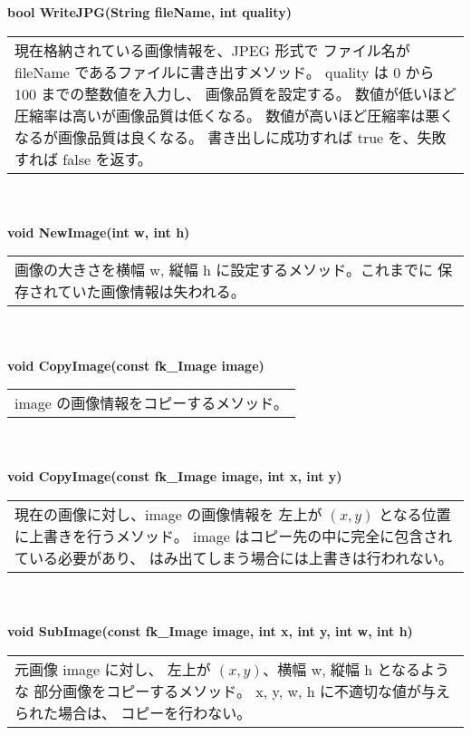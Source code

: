 \begin{tabbing}
\> \textbf{bool WriteJPG(String fileName, int quality)} \\
	\> \> \begin{tabular}{p{15cm}}
		現在格納されている画像情報を、JPEG 形式で
		ファイル名が fileName であるファイルに書き出すメソッド。
		quality は 0 から 100 までの整数値を入力し、
		画像品質を設定する。
		数値が低いほど圧縮率は高いが画像品質は低くなる。
		数値が高いほど圧縮率は悪くなるが画像品質は良くなる。
		書き出しに成功すれば true を、失敗すれば false を返す。
	\end{tabular} \\ \\

\> \textbf{void NewImage(int w, int h)} \\
	\> \> \begin{tabular}{p{15cm}}
		画像の大きさを横幅 w, 縦幅 h に設定するメソッド。これまでに
		保存されていた画像情報は失われる。
	\end{tabular} \\ \\

\> \textbf{void CopyImage(const fk\_Image image)} \\
	\> \> \begin{tabular}{p{15cm}}
		image の画像情報をコピーするメソッド。
	\end{tabular} \\ \\

\> \textbf{void CopyImage(const fk\_Image image, int x, int y)} \\
	\> \> \begin{tabular}{p{15cm}}
		現在の画像に対し、image の画像情報を
		左上が \((x, y)\) となる位置に上書きを行うメソッド。
		image はコピー先の中に完全に包含されている必要があり、
		はみ出てしまう場合には上書きは行われない。
	\end{tabular} \\ \\

\> \textbf{void SubImage(const fk\_Image image, int x, int y, int w, int h)} \\
	\> \> \begin{tabular}{p{15cm}}
		元画像 image に対し、
		左上が \((x, y)\)、横幅 w, 縦幅 h となるような
		部分画像をコピーするメソッド。
		x, y, w, h に不適切な値が与えられた場合は、
		コピーを行わない。
	\end{tabular} \\ \\


\end{tabbing}
